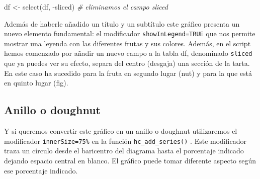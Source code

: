 \documentclass[
]{book}
\newenvironment{Shaded}{\begin{snugshade}}{\end{snugshade}}
\newcommand{\AttributeTok}[1]{\textcolor[rgb]{0.77,0.63,0.00}{#1}}
\newcommand{\CommentTok}[1]{\textcolor[rgb]{0.56,0.35,0.01}{\textit{#1}}}
\newcommand{\ConstantTok}[1]{\textcolor[rgb]{0.00,0.00,0.00}{#1}}
\newcommand{\FunctionTok}[1]{\textcolor[rgb]{0.00,0.00,0.00}{#1}}
\newcommand{\NormalTok}[1]{#1}
\newcommand{\OtherTok}[1]{\textcolor[rgb]{0.56,0.35,0.01}{#1}}
\newcommand{\SpecialCharTok}[1]{\textcolor[rgb]{0.00,0.00,0.00}{#1}}
\newcommand{\StringTok}[1]{\textcolor[rgb]{0.31,0.60,0.02}{#1}}
\begin{document}
\begin{Shaded}
\begin{Highlighting}[]
\NormalTok{df }\OtherTok{\textless{}{-}} \FunctionTok{select}\NormalTok{(df, }\SpecialCharTok{{-}}\NormalTok{sliced)}
\CommentTok{\# eliminamos el campo sliced}
\end{Highlighting}
\end{Shaded}

Además de haberle añadido un título y un subtítulo este gráfico presenta un nuevo elemento fundamental: el modificador \texttt{showInLegend=TRUE} que nos permite mostrar una leyenda con las diferentes frutas y sus colores. Además, en el script hemos comenzado por añadir un nuevo campo a la tabla df, denominado \texttt{sliced} que ya puedes ver su efecto, separa del centro (desgaja) una sección de la tarta. En este caso ha sucedido para la fruta en segundo lugar (nut) y para la que está en quinto lugar (fig).

\hypertarget{anillo-o-doughnut}{%
\subsection{Anillo o doughnut}\label{anillo-o-doughnut}}

Y si queremos convertir este gráfico en un anillo o doughnut utilizaremos el modificador \texttt{innerSize=\textquotesingle{}75\%\textquotesingle{}} en la función \texttt{hc\_add\_series()} . Este modificador traza un círculo desde el baricentro del diagrama hasta el porcentaje indicado dejando espacio central en blanco. El gráfico puede tomar diferente aspecto según ese porcentaje indicado.

\begin{Shaded}
\end{Shaded}
\end{document}
